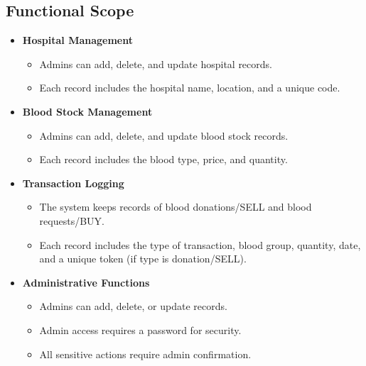 \documentclass[12pt,a4paper]{report}
\begin{document}
\subsection{Functional Scope}
\begin{itemize}
    \item \normalsize \textbf{Hospital Management}
    \begin{itemize}
        \item Admins can add, delete, and update hospital records.
        \item Each record includes the hospital name, location, and a unique code.
    \end{itemize}
    \item \normalsize \textbf{Blood Stock Management}
    \begin{itemize}
        \item Admins can add, delete, and update blood stock records.
        \item Each record includes the blood type, price, and quantity.
    \end{itemize}
    \item \normalsize \textbf{Transaction Logging}
    \begin{itemize}
        \item The system keeps records of blood donations/SELL and blood requests/BUY.\
        \item Each record includes the type of transaction, blood group, quantity, date, and a unique token (if type is donation/SELL).
    \end{itemize}
    \item \normalsize \textbf{Administrative Functions}
    \begin{itemize}
        \item Admins can add, delete, or update records.
        \item Admin access requires a password for security.
        \item All sensitive actions require admin confirmation.
    \end{itemize}
\end{itemize}
\end{document}
